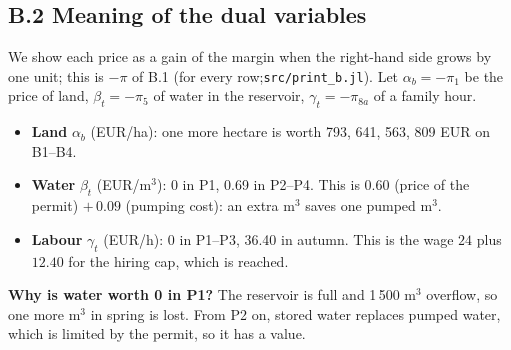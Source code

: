 \subsection*{B.2 \quad Meaning of the dual variables}

We show each price as a gain of the margin when the right-hand side grows by one unit; this is $-\pi$ of B.1 (for every row;\texttt{src/print\_b.jl}). Let $\alpha_b=-\pi_1$ be the price of land, $\beta_t=-\pi_5$ of water in the reservoir, $\gamma_t=-\pi_{8a}$ of a family hour.



\begin{itemize}
\item \textbf{Land} $\alpha_b$ (EUR/ha): one more hectare is worth 793, 641, 563, 809 EUR on B1--B4.\item \textbf{Water} $\beta_t$ (EUR/m$^3$): 0 in P1, 0.69 in P2--P4. This is $0.60$ (price of the permit) $+\,0.09$ (pumping cost): an extra m$^3$ saves one pumped m$^3$.
\item \textbf{Labour} $\gamma_t$ (EUR/h): 0 in P1--P3, 36.40 in autumn. This is the wage $24$ plus $12.40$ for the hiring cap, which is reached.
\end{itemize}

\textbf{Why is water worth 0 in P1?} The reservoir is full and 1\,500 m$^3$ overflow, so one more m$^3$ in spring is lost. From P2 on, stored water replaces pumped water, which is limited by the permit, so it has a value.
